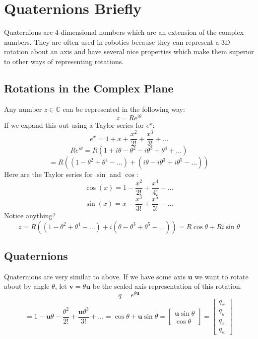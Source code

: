 \documentclass[11pt]{article}
\newcommand{\C}{\mathbb{C}}
\renewcommand{\vec}[1]{\mathbf{#1}}
\begin{document}
\section{Quaternions Briefly}
Quaternions are 4-dimensional numbers which are an extension of the complex numbers. They are often used in robotics because they can represent a 3D rotation about an axis and have several nice properties which make them superior to other ways of representing rotations.

\subsection{Rotations in the Complex Plane}
Any number $z \in \C$ can be represented in the following way:
$$z = Re^{i\theta}$$
If we expand this out using a Taylor series for $e^x$:
$$e^x = 1 + x + \frac{x^2}{2!} + \frac{x^3}{3!} + \dots$$
$$Re^{i\theta} = R(1 + i\theta - \theta^2 -i\theta^3 + \theta^4 + \dots)$$
$$ = R((1 - \theta^2 + \theta^4 - \dots) + (i\theta - i\theta^3 + i\theta^5 - \dots))$$
Here are the Taylor series for $\sin$ and $\cos$:
$$\cos(x) = 1 - \frac{x^2}{2!} + \frac{x^4}{4!} - \dots$$
$$\sin(x) = x - \frac{x^3}{3!} + \frac{x^5}{5!} - \dots$$
Notice anything?
$$z = R((1 - \theta^2 + \theta^4 - \dots) + i(\theta - \theta^3 + \theta^5 - \dots)) = R\cos\theta + Ri\sin\theta$$
\begin{center}

\end{center}

\subsection{Quaternions}
Quaternions are very similar to above. If we have some axis $\vec{u}$ we want to rotate about by angle $\theta$, let $\vec{v} = \theta\vec{u}$ be the scaled axis representation of this rotation.
$$q = e^{\theta\vec{u}}$$
$$= 1 - \vec{u}\theta - \frac{\theta^2}{2!} + \frac{\vec{u}\theta^3}{3!} + \dots = \cos\theta + \vec{u}\sin\theta = \begin{bmatrix}
\vec{u}\sin\theta\\
\cos\theta
\end{bmatrix} = \begin{bmatrix}
q_x\\ q_y\\ q_z\\ q_w
\end{bmatrix}$$
\end{document}
